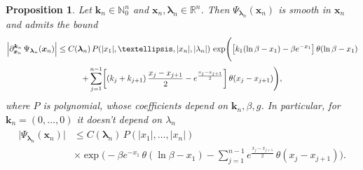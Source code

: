 \documentclass[10pt,a4paper]{amsart}
\newtheorem{proposition}{Proposition}
\begin{document}
\begin{proposition} \label{prop:bc-bound}
	Let $\bm{k}_n \in \mathbb{N}_0^n$ and $\bm{x}_n, \bm{\lambda}_n \in \mathbb{R}^n$. Then $\Psi_{\bm{\lambda}_n}(\bm{x}_n)$ is smooth in $\bm{x}_n$ and admits the bound
	\begin{multline} \label{dPsi-b}
			\Bigl| \partial_{\bm{x}_n}^{\bm{k}_n} \, \Psi_{\bm{\lambda}_n} (\bm{x}_n) \Bigr| \leq C(\bm{\lambda}_n) \, P(|x_1|, \dots, |x_n|, |\lambda_n|) \, \exp\Biggl( \bigl[ k_1 (\ln \beta - x_1) - \beta e^{-x_1} \bigr] \, \theta(\ln \beta - x_1) \\[2pt]
			+ \sum_{j = 1}^{n - 1} \biggl[ (k_j + k_{j + 1}) \, \frac{x_j - x_{j + 1}}{2} -  e^{ \frac{x_j - x_{j + 1} }{2} } \biggr] \, \theta(x_j - x_{j + 1} ) \Biggr),
	\end{multline}
	where $P$ is polynomial, whose coefficients depend on $\bm{k}_n, \beta, g$. In particular, for $\bm{k}_n = (0, \dots, 0)$ it doesn't depend on $\lambda_n$
	\begin{align} \label{Psin-b}
		\begin{aligned}
			\bigl| \Psi_{\bm{\lambda}_n}(\bm{x}_n) \bigr| & \leq C(\bm{\lambda}_n) \,  P(|x_1|, \dots, |x_n|) \\[6pt]
			& \times \exp\Biggl( - \beta e^{-x_1} \, \theta(\ln \beta - x_1) - \sum_{j = 1}^{n - 1}  e^{ \frac{x_j - x_{j + 1} }{2} }  \, \theta(x_j - x_{j + 1} ) \Biggr).
		\end{aligned}
	\end{align}
\end{proposition}
\end{document}
